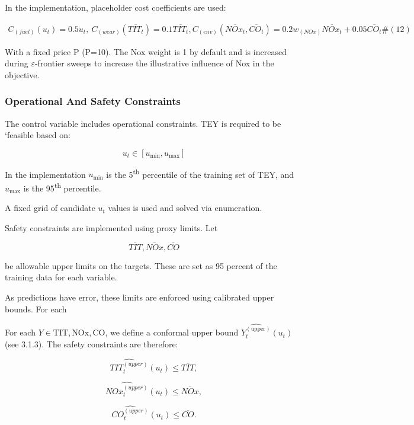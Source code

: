 \documentclass[11pt]{article}
\begin{document}
In the implementation, placeholder cost coefficients are used:

\[\begin{array}{r}
C_{(fuel)}\left( u_{t} \right) = 0.5u_{t},{\ C}_{(wear)}\left( \overline{TIT_{t}} \right) = 0.1\overline{TIT_{t}},C_{(env)}\left( \overline{NOx_{t}},\overline{CO_{t}} \right) = 0.2w_{(NOx)}\overline{NOx_{t}} + 0.05\overline{CO_{t}}\#(12)
\end{array}\]

With a fixed price P (P=10). The Nox weight is 1 by default and is
increased during \(\varepsilon\)-frontier sweeps to increase the
illustrative influence of Nox in the objective.

\subsubsection{Operational And Safety
Constraints}\label{operational-and-safety-constraints}

The control variable includes operational constraints. TEY is required
to be `feasible based on:

\[u_{t} \in \left\lbrack u_{\min},u_{\max} \right\rbrack\]

In the implementation \(u_{\min}\) is the 5\textsuperscript{th}
percentile of the training set of TEY, and \(u_{\max}\) is the
95\textsuperscript{th} percentile.

A fixed grid of candidate \(u_{t}\) values is used and solved via
enumeration.

Safety constraints are implemented using proxy limits. Let

\[\overline{TIT},\overline{NOx},\overline{CO}\]

be allowable upper limits on the targets. These are set as 95 percent of
the training data for each variable.

As predictions have error, these limits are enforced using calibrated
upper bounds. For each

For each \(Y \in \text{TIT},\text{NOx},\text{CO}\), we define a
conformal upper bound
\(\widehat{Y_{t}^{\left( \text{upper} \right)}}\left( u_{t} \right)\)
(see 3.1.3). The safety constraints are therefore:

\[\widehat{TIT_{t}^{(upper)}}\left( u_{t} \right) \leq \overline{TIT},\]

\[\widehat{NOx_{t}^{(upper)}}\left( u_{t} \right) \leq \overline{NOx},\]

\[\widehat{CO_{t}^{(upper)}}\left( u_{t} \right) \leq \overline{CO}.\]
\end{document}
